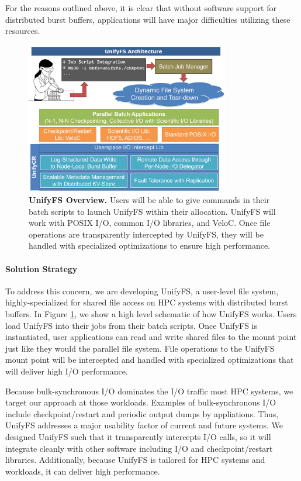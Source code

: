 For the reasons outlined above, it is clear that without software support 
for distributed burst buffers, applications
will have major difficulties utilizing these resources. 

\begin{figure}[htb]
        \centering
        \includegraphics[width=3.5in]{projects/2.3.4-DataViz/2.3.4.15-HDF5-UnifyCR/UnifyFS-overview}
        \caption{\label{fig:UnifyFS-overview} \textbf{UnifyFS Overview.} Users will be able to give commands in their batch scripts to launch UnifyFS within
their allocation. UnifyFS will work with POSIX I/O, common I/O libraries, and
VeloC. Once file operations are transparently intercepted by UnifyFS, they
will be handled with specialized optimizations to ensure high performance.}
\end{figure}

\paragraph{Solution Strategy}

To address this concern, we are developing UnifyFS, a user-level file system,
highly-specialized for shared file access on HPC systems with distributed
burst buffers. In Figure \ref{fig:UnifyFS-overview}, we show a high
level schematic of how UnifyFS works. Users load UnifyFS into
their jobs from their batch scripts. Once UnifyFS is instantiated, user
applications can read and write shared files to the mount point just like
they would the parallel file system. File operations to the UnifyFS
mount point will be intercepted and handled with specialized optimizations
that will deliver high I/O performance. 

Because bulk-synchronous I/O dominates the 
I/O traffic most HPC systems, we target our approach at
those workloads. Examples of bulk-synchronous I/O include checkpoint/restart
and periodic output dumps by appliations. Thus, UnifyFS  addresses a major usability
factor of current and future systems. We designed UnifyFS such
that it transparently intercepts I/O calls, so it will integrate
cleanly with other software including I/O and checkpoint/restart libraries.
Additionally, because UnifyFS is tailored for HPC systems and workloads,
it can deliver high performance.



